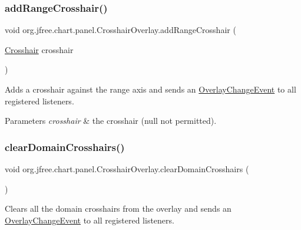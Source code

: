 \subsubsection{\texorpdfstring{add\+Range\+Crosshair()}{addRangeCrosshair()}}
{\footnotesize\ttfamily void org.\+jfree.\+chart.\+panel.\+Crosshair\+Overlay.\+add\+Range\+Crosshair (\begin{DoxyParamCaption}\item[{\mbox{\hyperlink{classorg_1_1jfree_1_1chart_1_1plot_1_1_crosshair}{Crosshair}}}]{crosshair }\end{DoxyParamCaption})}

Adds a crosshair against the range axis and sends an \mbox{\hyperlink{}{Overlay\+Change\+Event}} to all registered listeners.


\begin{DoxyParams}{Parameters}
{\em crosshair} & the crosshair ({\ttfamily null} not permitted). \\
\hline
\end{DoxyParams}
\mbox{\label{classorg_1_1jfree_1_1chart_1_1panel_1_1_crosshair_overlay_adbb4a19e547b9df6cf97c67c2826f0d0}} 
\subsubsection{\texorpdfstring{clear\+Domain\+Crosshairs()}{clearDomainCrosshairs()}}
{\footnotesize\ttfamily void org.\+jfree.\+chart.\+panel.\+Crosshair\+Overlay.\+clear\+Domain\+Crosshairs (\begin{DoxyParamCaption}{ }\end{DoxyParamCaption})}

Clears all the domain crosshairs from the overlay and sends an \mbox{\hyperlink{}{Overlay\+Change\+Event}} to all registered listeners. \mbox{\label{classorg_1_1jfree_1_1chart_1_1panel_1_1_crosshair_overlay_a2ab54dea5f40289c608c34333e278e3c}} 
